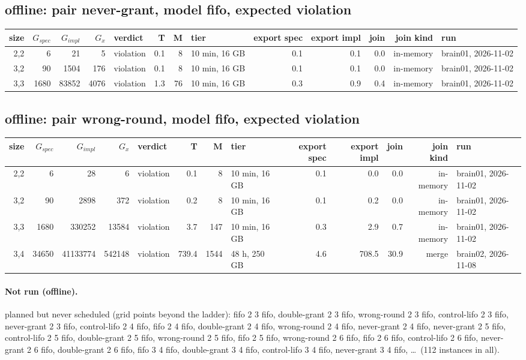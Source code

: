 \documentclass[10pt]{article}
\begin{document}
\subsection*{offline: pair \textsf{never-grant}, model fifo, expected violation}
\begin{longtable}{@{}rrrrlrrlrrrrl@{}}
\toprule
size & $G_{\mathit{spec}}$ & $G_{\mathit{impl}}$ & $G_x$ & verdict & T & M & tier & export spec & export impl & join & join kind & run \\
\midrule
\endhead
\color{red} 2,2 & 6 & 21 & 5 & violation & 0.1 & 8 & 10 min, 16 GB & 0.1 & 0.1 & 0.0 & in-memory & brain01, 2026-11-02 \\
\color{red} 3,2 & 90 & 1504 & 176 & violation & 0.1 & 8 & 10 min, 16 GB & 0.1 & 0.1 & 0.0 & in-memory & brain01, 2026-11-02 \\
\color{red} 3,3 & 1680 & 83852 & 4076 & violation & 1.3 & 76 & 10 min, 16 GB & 0.3 & 0.9 & 0.4 & in-memory & brain01, 2026-11-02 \\
\bottomrule
\end{longtable}
\subsection*{offline: pair \textsf{wrong-round}, model fifo, expected violation}
\begin{longtable}{@{}rrrrlrrlrrrrl@{}}
\toprule
size & $G_{\mathit{spec}}$ & $G_{\mathit{impl}}$ & $G_x$ & verdict & T & M & tier & export spec & export impl & join & join kind & run \\
\midrule
\endhead
\color{red} 2,2 & 6 & 28 & 6 & violation & 0.1 & 8 & 10 min, 16 GB & 0.1 & 0.0 & 0.0 & in-memory & brain01, 2026-11-02 \\
\color{red} 3,2 & 90 & 2898 & 372 & violation & 0.2 & 8 & 10 min, 16 GB & 0.1 & 0.2 & 0.0 & in-memory & brain01, 2026-11-02 \\
\color{red} 3,3 & 1680 & 330252 & 13584 & violation & 3.7 & 147 & 10 min, 16 GB & 0.3 & 2.9 & 0.7 & in-memory & brain01, 2026-11-02 \\
\color{blue} 3,4 & 34650 & 41133774 & 542148 & violation & 739.4 & 1544 & 48 h, 250 GB & 4.6 & 708.5 & 30.9 & merge & brain02, 2026-11-08 \\
\bottomrule
\end{longtable}
\paragraph{Not run (offline).}
planned but never scheduled (grid points beyond the ladder): fifo 2 3 fifo, double-grant 2 3 fifo, wrong-round 2 3 fifo, control-lifo 2 3 fifo, never-grant 2 3 fifo, control-lifo 2 4 fifo, fifo 2 4 fifo, double-grant 2 4 fifo, wrong-round 2 4 fifo, never-grant 2 4 fifo, never-grant 2 5 fifo, control-lifo 2 5 fifo, double-grant 2 5 fifo, wrong-round 2 5 fifo, fifo 2 5 fifo, wrong-round 2 6 fifo, fifo 2 6 fifo, control-lifo 2 6 fifo, never-grant 2 6 fifo, double-grant 2 6 fifo, fifo 3 4 fifo, double-grant 3 4 fifo, control-lifo 3 4 fifo, never-grant 3 4 fifo, \ldots\ (112 instances in all).\par
\end{document}
